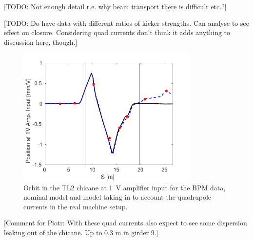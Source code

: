 [TODO: Not enough detail r.e. why beam transport there is difficult etc.?]

[TODO: Do have data with different ratios of kicker strengths. Can analyse to see effect on closure. Considering quad currents don't think it adds anything to discussion here, though.]

\begin{figure}
  \centering
  \includegraphics[width=0.8\textwidth]{Figures/commissioning/orbClosureVsQuadModel}
  \caption{Orbit in the TL2 chicane at 1~V amplifier input for the BPM data, nominal model and model taking in to account the quadrupole currents in the real machine setup.}
  \label{f:orbClosureVsQuadModel}
\end{figure}

[Comment for Piotr: With these quad currents also expect to see some dispersion leaking  out of the chicane. Up to 0.3 m in girder 9.]


